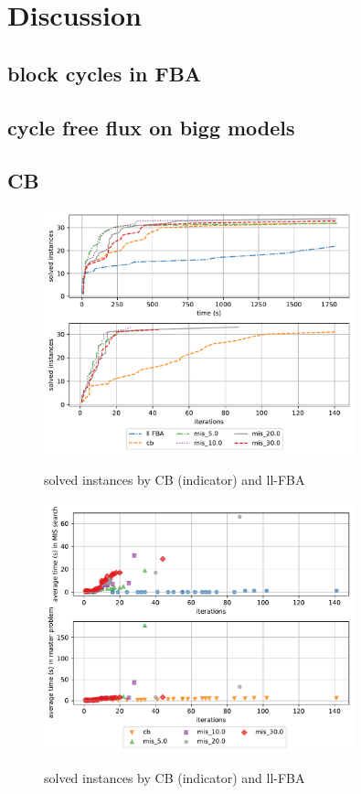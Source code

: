 \clearpage
\section{Discussion}

\subsection{block cycles in FBA}

\subsection{cycle free flux on bigg models}

\subsection{CB}

\begin{figure}[h!]
    \caption{solved instances by CB (indicator) and ll-FBA}
    \centering
    \includegraphics[width=0.8\textwidth]{Images/mis_comparison_solved_instances.pdf}
    \label{fig:mis_comparison_solved_instances}
\end{figure}

\begin{figure}[h!]
    \caption{solved instances by CB (indicator) and ll-FBA}
    \centering
    \includegraphics[width=0.8\textwidth]{Images/mis_comparison_time_vs_iterations.pdf}
    \label{fig:mis_comparison_time_vs_iterations}
\end{figure}

